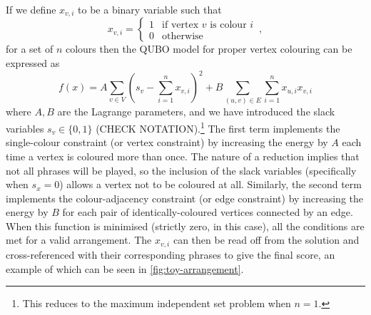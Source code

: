 \documentclass[12pt]{article}
\theoremstyle{definition}
\begin{document}
If we define $x_{v,i}$ to be a binary variable such that
\begin{equation}
    x_{v,i} =
    \begin{cases}
        1 & \text{if vertex $v$ is colour $i$} \\
        0 & \text{otherwise}
    \end{cases}
    \,,
\end{equation}
for a set of $n$ colours then the QUBO model for proper vertex colouring can be expressed as
\begin{equation}
    f(x)=A\sum_{v \in V}\left(s_v-\sum_{i=1}^{n} x_{v,i}\right)^2+B\sum_{(u,v) \in E}\sum_{i=1}^n x_{u,i}x_{v,i}
    \label{eq:colouring}
\end{equation}
where $A,B$ are the Lagrange parameters, and we have introduced the slack variables $s_v\in\{0,1\}$ (CHECK NOTATION).\footnote{This reduces to the maximum independent set problem when $n=1$.} The first term implements the single-colour constraint (or vertex constraint) by increasing the energy by $A$ each time a vertex is coloured more than once. The nature of a reduction implies that not all phrases will be played, so the inclusion of the slack variables (specifically when $s_x=0$) allows a vertex not to be coloured at all. Similarly, the second term implements the colour-adjacency constraint (or edge constraint) by increasing the energy by $B$ for each pair of identically-coloured vertices connected by an edge. When this function is minimised (strictly zero, in this case), all the conditions are met for a valid arrangement. The $x_{v,i}$ can then be read off from the solution and cross-referenced with their corresponding phrases to give the final score, an example of which can be seen in \cref{fig:toy-arrangement}.
\end{document}

